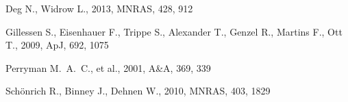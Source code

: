 Deg N., Widrow L., 2013, MNRAS, 428, 912 

Gillessen S., Eisenhauer F., Trippe S., Alexander T., Genzel R., Martins F., Ott T., 2009, ApJ, 692, 1075 

Perryman M.~A.~C., et al., 2001, A\&A, 369, 339 

Sch{\"o}nrich R., Binney J., Dehnen W., 2010, MNRAS, 403, 1829 

